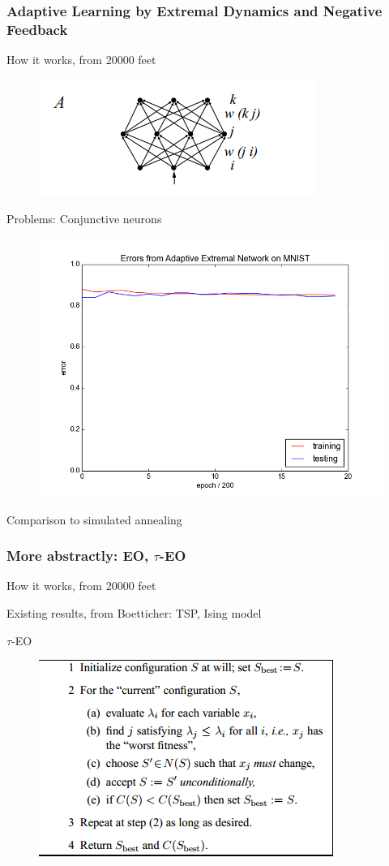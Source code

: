\documentclass{beamer}
\begin{document}
\begin{frame}
  \frametitle{Adaptive Learning by Extremal Dynamics and Negative Feedback}
  How it works, from 20000 feet
  \begin{figure}
    \includegraphics{bak_chialvo_net_topology}
  \end{figure}

  Problems: Conjunctive neurons
  \begin{figure}
    \includegraphics{bak_plot}
  \end{figure}
  
  Comparison to simulated annealing
\end{frame}

\begin{frame}
  \frametitle{More abstractly: EO, $\tau$-EO}
  How it works, from 20000 feet

  Existing results, from Boetticher: TSP, Ising model

  $\tau$-EO
  \begin{figure}
    \includegraphics{eo_alg}
  \end{figure}
\end{frame}
\end{document}
